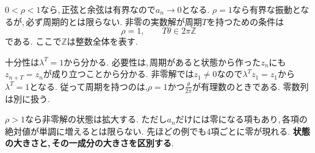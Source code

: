 $0<\rho<1$なら,\,正弦と余弦は有界なので$a_n\to0$となる.
$\rho=1$なら有界な振動となるが,\,必ず周期的とは限らない.
非零の実数解が周期$T$を持つための条件は
\[
 \rho=1,\qquad T\theta\in2\pi\mathbb Z
\]
である. ここで$\mathbb Z$は整数全体を表す.

十分性は$\lambda^T=1$から分かる.
必要性は,\,周期があると状態から作った$z_n$にも$z_{n+T}=z_n$が成り立つことから分かる.
非零解では$z_1\ne0$なので$\lambda^Tz_1=z_1$から$\lambda^T=1$となる.
従って周期を持つのは,$\rho=1$かつ$\frac{\theta}{2\pi}$が有理数のときである.
零数列は別に扱う.

$\rho>1$なら非零解の状態は拡大する.
ただし$a_n$だけには零になる項もあり,\,各項の絶対値が単調に増えるとは限らない.
先ほどの例でも4項ごとに零が現れる.
\textbf{状態の大きさと,\,その一成分の大きさを区別する}.
